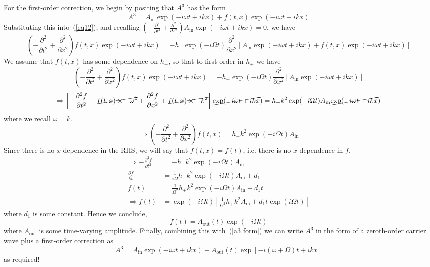 \documentclass[a4paper]{article} %
\begin{document}
For the first-order correction, we begin by positing that $A^3$ has the form
\begin{equation}
A^3 = A_{\text{in}}\exp(-i\omega t + ikx)+f(t,x)\exp(-i\omega t + ikx)\label{a3 form}
\end{equation}
Substituting this into~(\ref{eq12}), and recalling $\left(-\frac{\partial^2}{\partial t^2}+\frac{\partial^2}{\partial x^2}\right)A_{\text{in}}\exp(-i\omega t + ikx)=0$, we have
\begin{equation}
\left(-\frac{\partial^2}{\partial t^2}+\frac{\partial^2}{\partial x^2}\right)f(t,x)\exp(-i\omega t + ikx)
=-h_+\exp(-i\Omega t)\frac{\partial^2}{\partial x^2}\left[A_{\text{in}}\exp(-i\omega t + ikx) + f(t,x)\exp(-i\omega t + ikx)\right]
\end{equation}
We assume that $f(t,x)$ has some dependence on $h_+$, so that to first order in $h_+$ we have
\begin{equation}
\left(-\frac{\partial^2}{\partial t^2}+\frac{\partial^2}{\partial x^2}\right)f(t,x)\exp(-i\omega t + ikx)
=-h_+\exp(-i\Omega t)\frac{\partial^2}{\partial x^2}\left[A_{\text{in}}\exp(-i\omega t + ikx)\right]
\end{equation}
\begin{equation}
\Rightarrow \left[-\frac{\partial^2 f}{\partial t^2}-\cancel{f(t,x)\times-\omega^2}+\frac{\partial^2 f}{\partial x^2}
+\cancel{f(t,x)\times -k^2}\right]\cancel{\exp(-i\omega t + ikx)}=h_+ k^2 \exp(-i\Omega t)A_{\text{in}}
\cancel{\exp(-i\omega t + ikx)}
\end{equation}
where we recall $\omega = k$.
\begin{equation}
\Rightarrow \left(-\frac{\partial^2}{\partial t^2}+\frac{\partial^2}{\partial x^2}\right)f(t,x)=h_+ k^2
\exp(-i\Omega t) A_{\text{in}}
\end{equation}
Since there is no $x$ dependence in the RHS, we will say that $f(t,x)=f(t)$, i.e. there is no $x$-dependence in $f$.
\begin{align}
\Rightarrow -\frac{\partial^2 f}{\partial t^2}&=-h_+ k^2 \exp(-i\Omega t)A_{\text{in}}\\
\frac{\partial f}{\partial t}&=\frac{1}{i\Omega}h_+ k^2 \exp(-i\Omega t)A_{\text{in}}+d_1\\
f(t)&=\frac{1}{\Omega^2}h_+k^2 \exp(-i\Omega t)A_{\text{in}}+d_1 t\\
\Rightarrow f(t)&=\exp(-i\Omega t)\left[\frac{1}{\Omega ^2}h_+ k^2 A_{\text{in}}+d_1 t \exp(i\Omega t)\right]
\end{align}
where $d_1$ is some constant. Hence we conclude,
\begin{equation}
f(t)=A_{\text{out}}(t)\exp(-i\Omega t)
\end{equation}
where $A_{\text{out}}$ is some time-varying amplitude. Finally, combining this with~(\ref{a3 form}) we can write $A^3$ in the form of a zeroth-order carrier wave plus a first-order correction as
\begin{equation}
A^3 = A_{\text{in}}\exp(-i\omega t + ikx) + A_{\text{out}}(t)\exp[-i(\omega + \Omega)t + ikx]
\end{equation}
as required!
\end{document}
